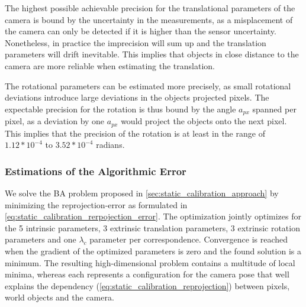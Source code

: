 The highest possible achievable precision for the translational parameters of the camera is bound by the uncertainty in the measurements, as a misplacement of the camera can only be detected if it is higher than the sensor uncertainty.
Nonetheless, in practice the imprecision will sum up and the translation parameters will drift inevitable. 
This implies that objects in close distance to the camera are more reliable when estimating the translation.

The rotational parameters can be estimated more precisely, as small rotational deviations introduce large deviations in the objects projected pixels.
The expectable precision for the rotation is thus bound by the angle $a_{px}$ spanned per pixel, as a deviation by one $a_{px}$ would project the objects onto the next pixel.
This implies that the precision of the rotation is at least in the range of $1.12 * 10^{-4}$ to $3.52 * 10^{-4}$ radians. 


\subsubsection{Estimations of the Algorithmic Error}
We solve the BA problem proposed in \autoref{sec:static_calibration_approach} by minimizing the reprojection-error as formulated in \autoref{eq:static_calibration_rerpojection_error}.
The optimization jointly optimizes for the 5 intrinsic parameters, 3 extrinsic translation parameters, 3 extrinsic rotation parameters and one $\lambda_c$ parameter per correspondence.
Convergence is reached when the gradient of the optimized parameters is zero and the found solution is a minimum.
The resulting high-dimensional problem contains a multitude of local minima, whereas each represents a configuration for the camera pose that well explains the dependency (\autoref{eq:static_calibration_reprojection}) between pixels, world objects and the camera. 

